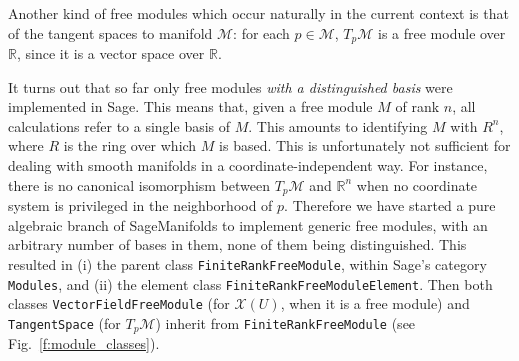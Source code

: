 \documentclass[a4paper]{jpconf}
\newcommand{\soft}[1]{\textsf{#1}}
\newcommand{\code}[1]{\texttt{#1}}
\newcommand{\Sage}{\soft{Sage}}
\newcommand{\SM}{\soft{SageManifolds}}
\begin{document}
Another kind of free modules which occur naturally in the current context
is that of the tangent spaces to manifold $\mathcal{M}$: 
for each $p\in \mathcal{M}$, $T_p\mathcal{M}$ is a free module over 
$\mathbb{R}$, since it is a vector space over $\mathbb{R}$. 

It turns out that so far only free modules \emph{with a distinguished basis} were 
implemented in \Sage{}. This means that, given a free module $M$ of rank $n$, 
all calculations refer to a single basis of $M$. This amounts to identifying
$M$ with $R^n$, where $R$ is the ring over which $M$ is based. 
This is unfortunately not sufficient for dealing with smooth manifolds in a
coordinate-independent way. 
For instance, there is no canonical 
isomorphism between $T_p\mathcal{M}$ and $\mathbb{R}^n$ when no coordinate
system is privileged in the neighborhood of $p$.
Therefore we have started a pure algebraic branch of \SM{} to implement
generic free modules, with an arbitrary number of bases in them, 
none of them being distinguished. This resulted in (i) the parent class 
\code{FiniteRankFreeModule}, within \Sage{}'s category \code{Modules}, and (ii)
the element class 
\code{FiniteRankFreeModuleElement}. Then both classes
\code{VectorFieldFreeModule} (for $\mathscr{X}(U)$, when it is 
a free module) and \code{TangentSpace} (for $T_p\mathcal{M}$)
inherit from \code{FiniteRankFreeModule} (see Fig.~\ref{f:module_classes}). 
\end{document}
